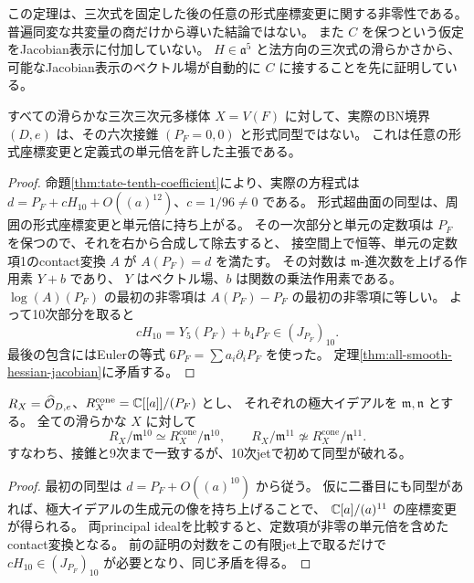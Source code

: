 \begin{remark}[主張の範囲]
この定理は、三次式を固定した後の任意の形式座標変更に関する非零性である。
普遍同変な共変量の商だけから導いた結論ではない。
また $C$ を保つという仮定をJacobian表示に付加していない。
$H\in\mathfrak a^5$ と法方向の三次式の滑らかさから、
可能なJacobian表示のベクトル場が自動的に $C$ に接することを先に証明している。
\end{remark}

\begin{corollary}[実際の境界の形式非斉次性]
\label{cor:all-smooth-nonhomogeneity}
すべての滑らかな三次三次元多様体 $X=V(F)$ に対して、実際のBN境界
$(D,e)$ は、その六次接錐 $(P_F=0,0)$ と形式同型ではない。
これは任意の形式座標変更と定義式の単元倍を許した主張である。
\end{corollary}
\begin{proof}
命題\ref{thm:tate-tenth-coefficient}により、実際の方程式は
$d=P_F+cH_{10}+O((a)^{12})$、$c=1/96\ne0$ である。
形式超曲面の同型は、周囲の形式座標変更と単元倍に持ち上がる。
その一次部分と単元の定数項は $P_F$ を保つので、それを右から合成して除去すると、
接空間上で恒等、単元の定数項1のcontact変換 $A$ が $A(P_F)=d$ を満たす。
その対数は $\mathfrak m$-進次数を上げる作用素 $Y+b$ であり、
$Y$ はベクトル場、$b$ は関数の乗法作用素である。
$\log(A)(P_F)$ の最初の非零項は $A(P_F)-P_F$ の最初の非零項に等しい。
よって10次部分を取ると
\[
 cH_{10}=Y_5(P_F)+b_4P_F\in(J_{P_F})_{10}.
\]
最後の包含にはEulerの等式 $6P_F=\sum a_i\partial_iP_F$ を使った。
定理\ref{thm:all-smooth-hessian-jacobian}に矛盾する。
\end{proof}


\begin{corollary}[最初の形式同型障害の次数]\label{cor:boundary-tenth-jet-obstruction}
$R_X=\widehat{\mathcal O}_{D,e}$、$R_X^{\mathrm{cone}}=\mathbb C[[a]]/(P_F)$ とし、
それぞれの極大イデアルを $\mathfrak m,\mathfrak n$ とする。
全ての滑らかな $X$ に対して
\[
 R_X/\mathfrak m^{10}\simeq R_X^{\mathrm{cone}}/\mathfrak n^{10},
 \qquad
 R_X/\mathfrak m^{11}\not\simeq R_X^{\mathrm{cone}}/\mathfrak n^{11}.
\]
すなわち、接錐と9次まで一致するが、10次jetで初めて同型が破れる。
\end{corollary}
\begin{proof}
最初の同型は $d=P_F+O((a)^{10})$ から従う。
仮に二番目にも同型があれば、極大イデアルの生成元の像を持ち上げることで、
$\mathbb C[a]/(a)^{11}$ の座標変更が得られる。
両principal idealを比較すると、定数項が非零の単元倍を含めたcontact変換となる。
前の証明の対数をこの有限jet上で取るだけで
$cH_{10}\in(J_{P_F})_{10}$ が必要となり、同じ矛盾を得る。
\end{proof}

